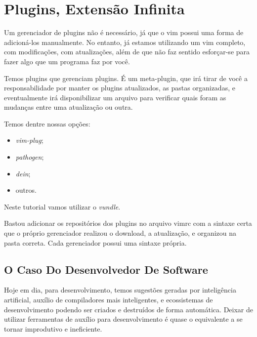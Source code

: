 \chapter{Plugins, Extensão Infinita}
Um gerenciador de plugins não é necessário, já que o vim possui uma forma de adicioná-los manualmente.
No entanto, já estamos utilizando um vim completo, com modificações, com atualizações,
além de que não faz sentido esforçar-se para fazer algo que um programa faz por você.


Temos plugins que gerenciam plugins.
É um meta-plugin, que irá tirar de você a responsabilidade por manter os plugins atualizados,
as pastas organizadas, e eventualmente irá disponibilizar um arquivo para verificar quais foram
as mudanças entre uma atualização ou outra.


Temos dentre nossas opções:
\begin{multicols}{2}
\begin{itemize}
	\item \emph{vim-plug};
	\item \emph{pathogen};
	\item \emph{dein};
	\item outros.
\end{itemize}
\end{multicols}
Neste tutorial vamos utilizar o \emph{vundle}.


Bastou adicionar os repositórios dos plugins no arquivo vimrc com a sintaxe certa que o próprio gerenciador
realizou o download, a atualização, e organizou na pasta correta.
Cada gerenciador possui uma sintaxe própria.

\section{O Caso Do Desenvolvedor De Software}
Hoje em dia, para desenvolvimento, temos sugestões geradas por inteligência artificial,
auxílio de compiladores mais inteligentes,
e ecossistemas de desenvolvimento podendo ser criados e destruídos de forma automática.
Deixar de utilizar ferramentas de auxílio para desenvolvimento é quase o equivalente a se tornar
improdutivo e ineficiente.

